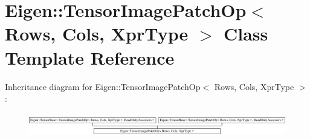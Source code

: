 \hypertarget{class_eigen_1_1_tensor_image_patch_op}{}\section{Eigen\+:\+:Tensor\+Image\+Patch\+Op$<$ Rows, Cols, Xpr\+Type $>$ Class Template Reference}
\label{class_eigen_1_1_tensor_image_patch_op}
Inheritance diagram for Eigen\+:\+:Tensor\+Image\+Patch\+Op$<$ Rows, Cols, Xpr\+Type $>$\+:\begin{figure}[H]
\begin{center}
\leavevmode
\includegraphics[height=1.035120cm]{class_eigen_1_1_tensor_image_patch_op}
\end{center}
\end{figure}
